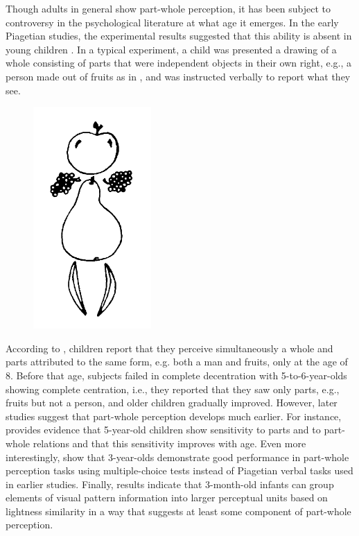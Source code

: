 Though adults in general show part-whole perception, it has been subject to controversy in the psychological literature at what age it emerges. In the early Piagetian studies, the experimental results suggested that this ability is absent in young children \citep{elkind_koegler_go1964studies}. In a typical experiment, a child was presented a drawing of a whole consisting of parts that were independent objects in their own right, e.g., a person made out of fruits as in , and was instructed verbally to report what they see. 

\begin{figure}[h!]
\centering
\includegraphics[scale=0.3]{figures/fruitman.png}
\label{fig:part-whole-perception}
\end{figure}

According to \citeauthor{elkind_koegler_go1964studies}, children report that they perceive simultaneously a whole and parts attributed to the same form, e.g. both a man and fruits, only at the age of 8. Before that age, subjects failed in complete decentration with 5-to-6-year-olds showing complete centration, i.e., they reported that they saw only parts, e.g., fruits but not a person, and older children gradually improved. However, later studies suggest that part-whole perception develops much earlier. For instance, \citet{kimchi1993basic} provides evidence that 5-year-old children show sensitivity to parts and to part-whole relations and that this sensitivity improves with age. Even more interestingly, \citet{boisvert_standing_moller1999successful} show that 3-year-olds demonstrate good performance in part-whole perception tasks using multiple-choice tests instead of Piagetian verbal tasks used in earlier studies. Finally,  results indicate that 3-month-old infants can group elements of visual pattern information into larger perceptual units based on lightness similarity in a way that suggests at least some component of part-whole perception.

